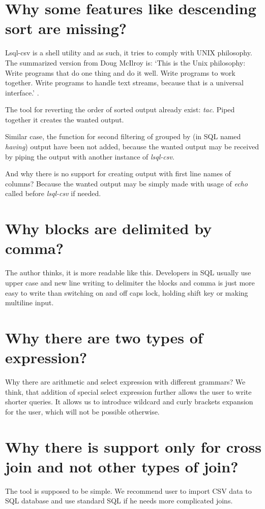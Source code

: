 \section{Why some features like descending sort are missing?}
Lsql-csv is a shell utility and as such, it tries to comply with UNIX philosophy. 
The summarized version from Doug McIlroy is: `This is the Unix philosophy: Write programs that do one thing and do it well. Write programs to work together. Write programs to handle text streams, because that is a universal interface.' \cite{unix-philosophy}.

The tool for reverting the order of sorted output already exist: \textit{tac}. Piped together it creates the wanted output.

Similar case, the function for second filtering of grouped by (in SQL named \textit{having}) 
output have been not added, because the wanted output
may be received by piping the output with another instance of \textit{lsql-csv}.

And why there is no support for creating output with first line names of columns? Because the wanted output
may be simply made with usage of \textit{echo} called before \textit{lsql-csv} if needed.

\section{Why blocks are delimited by comma?}
The author thinks, it is more readable like this. Developers in SQL usually use upper case and new line writing to delimiter the blocks and comma is just more easy to write than switching on and off caps lock, holding shift key or making multiline input.

\section{Why there are two types of expression?}
Why there are arithmetic and select expression with different grammars?
We think, that addition of special select expression further allows the user to write shorter queries.
It allows us to introduce wildcard and curly brackets expansion for the user, which will not be possible otherwise.

\section{Why there is support only for cross join and not other types of join?}
The tool is supposed to be simple. We recommend user to import CSV data to SQL database and use standard SQL if he needs more complicated joins.


